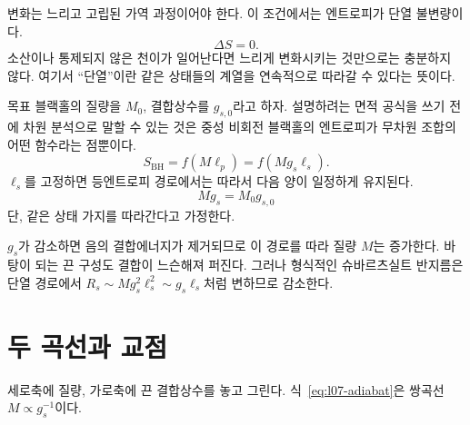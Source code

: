 변화는 느리고 고립된 가역 과정이어야 한다. 이 조건에서는 엔트로피가 단열 불변량이다.
\begin{equation}
\Delta S=0.
\label{eq:l07-adiabatic}
\end{equation}
소산이나 통제되지 않은 천이가 일어난다면 느리게 변화시키는 것만으로는 충분하지 않다. 여기서 ``단열''이란 같은 상태들의 계열을 연속적으로 따라갈 수 있다는 뜻이다.

목표 블랙홀의 질량을 \(M_0\), 결합상수를 \(g_{s,0}\)라고 하자. 설명하려는 면적 공식을 쓰기 전에 차원 분석으로 말할 수 있는 것은 중성 비회전 블랙홀의 엔트로피가 무차원 조합의 어떤 함수라는 점뿐이다.
\begin{equation}
S_{\mathrm{BH}}=f(M\ell_p)
=f(Mg_s\ell_s).
\label{eq:l07-entropy-function}
\end{equation}
\(\ell_s\)를 고정하면 등엔트로피 경로에서는 따라서 다음 양이 일정하게 유지된다.
\begin{equation}
Mg_s=M_0g_{s,0}
\label{eq:l07-adiabat}
\end{equation}
단, 같은 상태 가지를 따라간다고 가정한다.

\(g_s\)가 감소하면 음의 결합에너지가 제거되므로 이 경로를 따라 질량 \(M\)는 증가한다. 바탕이 되는 끈 구성도 결합이 느슨해져 퍼진다. 그러나 형식적인 슈바르츠실트 반지름은 단열 경로에서 \(R_s\sim Mg_s^2\ell_s^2\sim g_s\ell_s\)처럼 변하므로 감소한다.

\begin{classroomqa}
\end{classroomqa}

\section{두 곡선과 교점}

세로축에 질량, 가로축에 끈 결합상수를 놓고 그린다. 식~\eqref{eq:l07-adiabat}은 쌍곡선 \(M\propto g_s^{-1}\)이다.

